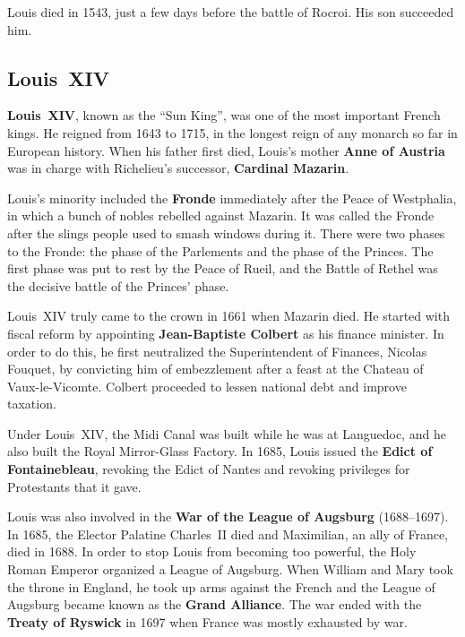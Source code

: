 Louis died in 1543, just a few days before the battle of Rocroi.
His son succeeded him.

\subsection*{Louis~XIV}

\textbf{Louis~XIV}, known as the ``Sun King'', was one of the most important French kings.
He reigned from 1643 to 1715, in the longest reign of any monarch so far in European history.
When his father first died,
Louis's mother \textbf{Anne of Austria} was in charge with Richelieu's successor, \textbf{Cardinal Mazarin}.

Louis's minority included the \textbf{Fronde} immediately after the Peace of Westphalia,
in which a bunch of nobles rebelled against Mazarin.
It was called the Fronde after the slings people used to smash windows during it.
There were two phases to the Fronde: the phase of the Parlements and the phase of the Princes.
The first phase was put to rest by the Peace of Rueil,
and the Battle of Rethel was the decisive battle of the Princes' phase.

Louis~XIV truly came to the crown in 1661 when Mazarin died.
He started with fiscal reform by appointing \textbf{Jean-Baptiste Colbert} as his finance minister.
In order to do this, he first neutralized the Superintendent of Finances, Nicolas Fouquet,
by convicting him of embezzlement after a feast at the Chateau of Vaux-le-Vicomte.
Colbert proceeded to lessen national debt and improve taxation.

Under Louis~XIV, the Midi Canal was built while he was at Languedoc,
and he also built the Royal Mirror-Glass Factory.
In 1685, Louis issued the \textbf{Edict of Fontainebleau},
revoking the Edict of Nantes and revoking privileges for Protestants that it gave.

Louis was also involved in the \textbf{War of the League of Augsburg} (1688--1697).
In 1685, the Elector Palatine Charles~II died and Maximilian, an ally of France, died in 1688.
In order to stop Louis from becoming too powerful, the Holy Roman Emperor organized a League of Augsburg.
When William and Mary took the throne in England,
he took up arms against the French and the League of Augsburg became known as the \textbf{Grand Alliance}.
The war ended with the \textbf{Treaty of Ryswick} in 1697 when France was mostly exhausted by war.

